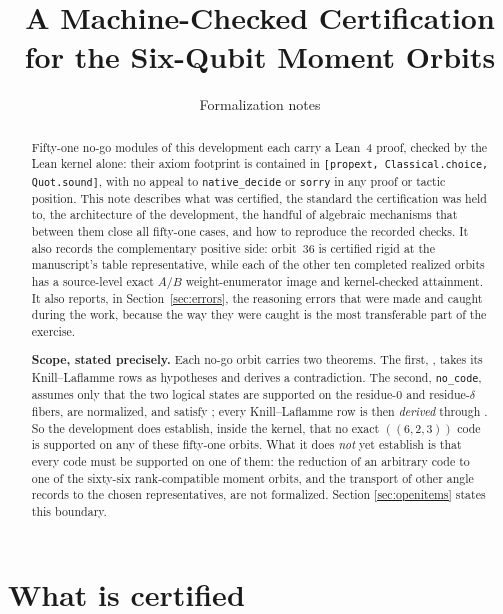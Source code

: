 \documentclass[11pt,a4paper]{article}
\title{A Machine-Checked Certification for the Six-Qubit Moment Orbits}
\author{Formalization notes}
\date{}
\newcommand{\lean}[1]{\texttt{#1}}
\theoremstyle{definition}
\begin{document}
\maketitle

\begin{abstract}
Fifty-one no-go modules of this development each carry a Lean~4 proof, checked
by the Lean kernel alone: their axiom footprint is contained in
\lean{[propext, Classical.choice, Quot.sound]}, with no appeal to
\lean{native\_decide} or \lean{sorry} in any proof or tactic position. This note
describes what was certified, the standard the certification was held to, the
architecture of the development, the handful of algebraic mechanisms that
between them close all fifty-one cases, and how to reproduce the recorded checks.
It also records the complementary positive side: orbit~36 is certified rigid at
the manuscript's table representative, while each of the other ten completed
realized orbits has a source-level exact $A/B$ weight-enumerator image and
kernel-checked attainment. It
also reports, in Section~\ref{sec:errors}, the reasoning errors that were made
and caught during the work, because the way they were caught is the most
transferable part of the exercise.

\medskip
\noindent\textbf{Scope, stated precisely.} Each no-go orbit carries two theorems. The
first, , takes its Knill--Laflamme rows as hypotheses
and derives a contradiction. The second, \lean{no\_code}, assumes only that the
two logical states are supported on the residue-$0$ and residue-$\delta$ fibers,
are normalized, and satisfy ; every
Knill--Laflamme row is then \emph{derived} through
. So the development does establish, inside the
kernel, that no exact $((6,2,3))$ code is supported on any of these fifty-one
orbits. What it does \emph{not} yet establish is that every code must be
supported on one of them: the reduction of an arbitrary code to one of the
sixty-six rank-compatible moment orbits, and the transport of other angle
records to the chosen representatives, are not formalized. Section
\ref{sec:openitems} states this boundary.
\end{abstract}

\tableofcontents

\section{What is certified}
\end{document}
